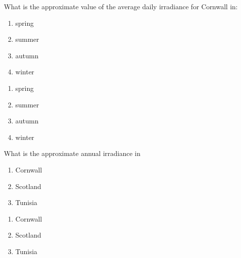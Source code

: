 \documentclass[class=scrartcl, crop=false,parskip=half]{standalone}
\begin{document}
\begin{question}
    What is the approximate value of the average daily irradiance for Cornwall in:
    \begin{enumerate}[label=\alph*)]
        \item spring
        \item summer
        \item autumn
        \item winter
    \end{enumerate}
\end{question}
\begin{solution}
    \begin{enumerate}[label=\alph*)]
        \item spring \ 
        \item summer \ 
        \item autumn \ 
        \item winter \ 
    \end{enumerate}
\end{solution}

\begin{question}
What is the approximate annual irradiance in
    \begin{enumerate}[label=\alph*)]
        \item Cornwall
        \item Scotland
        \item Tunisia
    \end{enumerate}
\end{question}
\begin{solution}
    \begin{enumerate}[label=\alph*)]
        \item Cornwall \ 
        \item Scotland \ 
        \item Tunisia \ 
    \end{enumerate}
\end{solution}

\printsolutions
\end{document}
